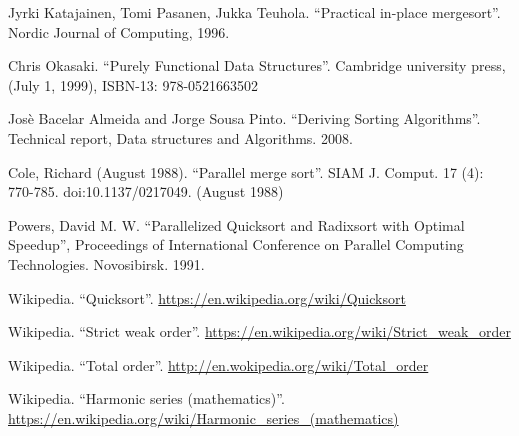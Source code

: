 \documentclass[b5paper]{ctexart}
\begin{document}
\begin{thebibliography}{99}
Jyrki Katajainen, Tomi Pasanen, Jukka Teuhola. ``Practical in-place mergesort''. Nordic Journal of Computing, 1996.

Chris Okasaki. ``Purely Functional Data Structures''. Cambridge university press, (July 1, 1999), ISBN-13: 978-0521663502

Jos\`{e} Bacelar Almeida and Jorge Sousa Pinto. ``Deriving Sorting Algorithms''. Technical report, Data structures and Algorithms. 2008.

Cole, Richard (August 1988). ``Parallel merge sort''. SIAM J. Comput. 17 (4): 770-785. doi:10.1137/0217049. (August 1988)

Powers, David M. W. ``Parallelized Quicksort and Radixsort with Optimal Speedup'', Proceedings of International Conference on Parallel Computing Technologies. Novosibirsk. 1991.

Wikipedia. ``Quicksort''. \url{https://en.wikipedia.org/wiki/Quicksort}

Wikipedia. ``Strict weak order''. \url{https://en.wikipedia.org/wiki/Strict_weak_order}

Wikipedia. ``Total order''. \url{http://en.wokipedia.org/wiki/Total_order}

Wikipedia. ``Harmonic series (mathematics)''. \url{https://en.wikipedia.org/wiki/Harmonic_series_(mathematics)}

\end{thebibliography}

\expandafter\enddocument
\fi
\end{document}
